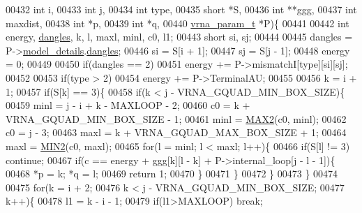 \begin{DoxyCode}
00432                                               \textcolor{keywordtype}{int} i,
00433                                               \textcolor{keywordtype}{int} j,
00434                                               \textcolor{keywordtype}{int} type,
00435                                               \textcolor{keywordtype}{short} *S,
00436                                               \textcolor{keywordtype}{int} **ggg,
00437                                               \textcolor{keywordtype}{int} maxdist,
00438                                               \textcolor{keywordtype}{int} *p,
00439                                               \textcolor{keywordtype}{int} *q,
00440                                               \hyperlink{group__energy__parameters_structvrna__param__s}{vrna\_param\_t} *P)\{
00441 
00442   \textcolor{keywordtype}{int} energy, \hyperlink{group__model__details_ga72b511ed1201f7e23ec437e468790d74}{dangles}, k, l, maxl, minl, c0, l1;
00443   \textcolor{keywordtype}{short} si, sj;
00444 
00445   dangles = P->\hyperlink{group__energy__parameters_a7b84353eb9075c595bad4ceb871bcae7}{model\_details}.\hyperlink{group__model__details_adcda4ff2ea77748ae0e8700288282efc}{dangles};
00446   si      = S[i + 1];
00447   sj      = S[j - 1];
00448   energy  = 0;
00449 
00450   \textcolor{keywordflow}{if}(dangles == 2)
00451     energy += P->mismatchI[type][si][sj];
00452 
00453   \textcolor{keywordflow}{if}(type > 2)
00454     energy += P->TerminalAU;
00455 
00456   k = i + 1;
00457   \textcolor{keywordflow}{if}(S[k] == 3)\{
00458     \textcolor{keywordflow}{if}(k < j - VRNA\_GQUAD\_MIN\_BOX\_SIZE)\{
00459       minl  = j - i + k - MAXLOOP - 2;
00460       c0    = k + VRNA\_GQUAD\_MIN\_BOX\_SIZE - 1;
00461       minl  = \hyperlink{group__utils_ga33297b3679c713b0c4d897cd0fe3b122}{MAX2}(c0, minl);
00462       c0    = j - 3;
00463       maxl  = k + VRNA\_GQUAD\_MAX\_BOX\_SIZE + 1;
00464       maxl  = \hyperlink{group__utils_gae0b9cd0ce090bd69b951aa73e8fa4f7d}{MIN2}(c0, maxl);
00465       \textcolor{keywordflow}{for}(l = minl; l < maxl; l++)\{
00466         \textcolor{keywordflow}{if}(S[l] != 3) \textcolor{keywordflow}{continue};
00467         \textcolor{keywordflow}{if}(c == energy + ggg[k][l - k] + P->internal\_loop[j - l - 1])\{
00468           *p = k; *q = l;
00469           \textcolor{keywordflow}{return} 1;
00470         \}
00471       \}
00472     \}
00473   \}
00474 
00475   \textcolor{keywordflow}{for}(k = i + 2;
00476       k < j - VRNA\_GQUAD\_MIN\_BOX\_SIZE;
00477       k++)\{
00478     l1    = k - i - 1;
00479     \textcolor{keywordflow}{if}(l1>MAXLOOP) \textcolor{keywordflow}{break};

\end{DoxyCode}
